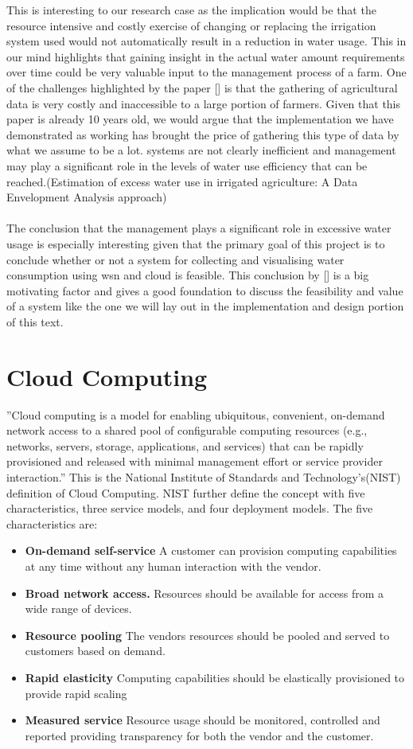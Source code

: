 \documentclass[]{uiophd}
\begin{document}
This is interesting to our research case as the implication would be that the resource intensive and costly exercise of changing or replacing the irrigation system used would not automatically result in a reduction in water usage. This in our mind highlights that gaining insight in the actual water amount requirements over time could be very valuable input to the management process of a farm. One of  the challenges highlighted by the paper [] is that the gathering of agricultural data is very costly and inaccessible to a large portion of farmers. Given that this paper is already 10 years old, we would argue that the implementation we have demonstrated as working has brought the price of gathering this type of data by what we assume to be a lot. systems are not clearly inefficient and management may play a significant role in the levels of water use efficiency that can be reached.(Estimation of excess water use in irrigated agriculture:
A Data Envelopment Analysis approach)
\\\\
The conclusion that the management plays a significant role in excessive water usage is especially interesting given that the primary goal of this project is to conclude whether or not a system for collecting and visualising water consumption using wsn and cloud is feasible. This conclusion by [] is a big motivating factor and gives a good foundation to discuss the feasibility and value of a system like the one we will lay out in the implementation and design portion of this text.

\section{Cloud Computing}
''Cloud computing is a model for enabling ubiquitous, convenient, on-demand network access to a shared pool of configurable computing resources (e.g., networks, servers, storage, applications, and services) that can be rapidly provisioned and released with minimal management effort or service provider interaction.''\cite{Mell:2011:SND:2206223} This is the National Institute of Standards and Technology's(NIST) definition of Cloud Computing. NIST further define the concept with five characteristics, three service models, and four deployment models\cite{Mell:2011:SND:2206223}. The five characteristics are:
\begin{itemize}
\item \textbf{On-demand self-service} A customer can provision computing capabilities at any time without any human interaction with the vendor.
\item \textbf{Broad network access.} Resources should be available for access from a wide range of devices.
\item \textbf{Resource pooling} The vendors resources should be pooled and served to customers based on demand.
\item \textbf{Rapid elasticity} Computing capabilities should be elastically provisioned to provide rapid scaling 
\item \textbf{Measured service} Resource usage should be monitored, controlled and reported providing transparency for both the vendor and the customer.
\end{itemize}
\end{document}

